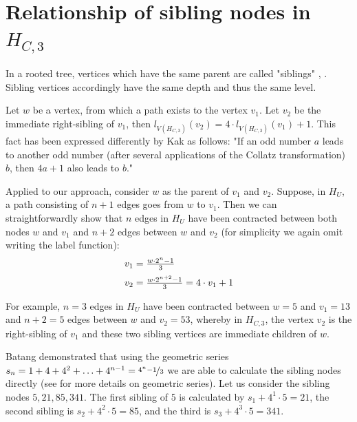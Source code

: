\section{\texorpdfstring{Relationship of sibling nodes in $H_{C,3}$}{Relationship of sibling nodes in HC3}}
\label{sec:relationship_sibling_nodes_k3}

In a rooted tree, vertices which have the same parent are called "siblings" \cite[p.~702]{Ref_Johnsonbaugh}, \cite[p.~747]{Ref_Rosen}. Sibling vertices accordingly have the same depth and thus the same level.

Let $w$ be a vertex, from which a path exists to the vertex $v_1$. Let $v_2$ be the immediate right-sibling of $v_1$, then $l_{V\left(H_{C,3}\right)}\left(v_2\right)=4\cdot l_{V\left(H_{C,3}\right)}\left(v_1\right)+1$. This fact has been expressed differently by Kak \cite{Ref_Kak_2014} as follows: "If an odd number $a$ leads to another odd number (after several applications of the Collatz transformation) $b$, then $4a+1$ also leads to $b$."

Applied to our approach, consider $w$ as the parent of $v_1$ and $v_2$. Suppose, in $H_U$, a path consisting of $n+1$ edges goes from $w$ to $v_1$. Then we can straightforwardly show that $n$ edges in $H_U$ have been contracted between both nodes $w$ and $v_1$ and $n+2$ edges between $w$ and $v_2$ (for simplicity we again omit writing the label function):
\begin{equation}
\label{eq:next_sibling_k3}
\begin{array}{l}
		v_1=\frac{w\cdot2^n-1}{3}
		\\[\medskipamount]
		v_2=\frac{w\cdot2^{n+2}-1}{3}=4\cdot v_1+1
\end{array}
\end{equation}

For example, $n=3$ edges in $H_U$ have been contracted between $w=5$ and $v_1=13$ and $n+2=5$ edges between $w$ and $v_2=53$, whereby in $H_{C,3}$, the vertex $v_2$ is the right-sibling of $v_1$ and these two sibling vertices are immediate children of $w$.

Batang \cite{Ref_Batang} demonstrated that using the geometric series $s_n=1+4+4^2+\ldots+4^{n-1}=\nicefrac{4^n-1}{3}$ we are able to calculate the sibling nodes directly (see \cite[p.~191-192]{Ref_Teschl_2013} for more details on geometric series). Let us consider the sibling nodes $5,21,85,341$. The first sibling of $5$ is calculated by $s_1+4^1\cdot5=21$, the second sibling is $s_2+4^2\cdot5=85$, and the third is $s_3+4^3\cdot5=341$.

